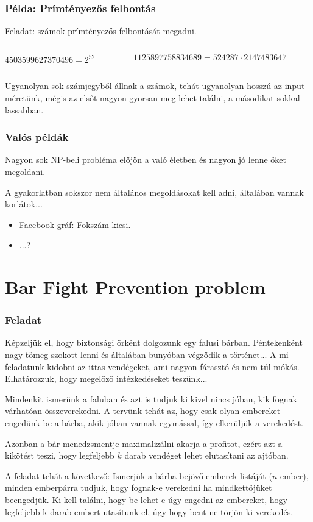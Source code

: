 \documentclass[aspectratio=169]{beamer}
\newcommand{\mkspace}{\vspace{19pt}}
\begin{document}
\begin{frame}[t]
\frametitle{Példa: Prímtényezős felbontás}

Feladat: számok prímtényezős felbontását megadni.

\mkspace
\begin{columns}
\begin{column}{0.487\textwidth}
$4503599627370496 = 2^{52}$
\end{column}
\begin{column}{0.487\textwidth}
$1125897758834689 = 524287 \cdot 2147483647$
\end{column}
\end{columns}
\mkspace

Ugyanolyan sok számjegyből állnak a számok, tehát ugyanolyan hosszú az input méretünk, mégis az elsőt
nagyon gyorsan meg lehet találni, a másodikat sokkal lassabban.

\end{frame}

\begin{frame}
\frametitle{Valós példák}
Nagyon sok NP-beli probléma előjön a való életben és nagyon jó lenne őket megoldani.

A gyakorlatban sokszor nem általános megoldásokat kell adni, általában vannak korlátok...

\begin{itemize}
\item Facebook gráf: Fokszám kicsi.
\item ...?
\end{itemize}

\end{frame}

\section{Bar Fight Prevention problem}

\begin{frame}
\frametitle{Feladat}
Képzeljük el, hogy biztonsági őrként dolgozunk egy falusi bárban. Péntekenként nagy tömeg szokott lenni és
általában bunyóban végződik a történet... A mi feladatunk kidobni az ittas vendégeket, ami nagyon fárasztó
és nem túl mókás. Elhatározzuk, hogy megelőző intézkedéseket teszünk...

Mindenkit ismerünk a faluban és azt is tudjuk ki kivel nincs jóban, kik fognak várhatóan összeverekedni.
A tervünk tehát az, hogy csak olyan embereket engedünk be a bárba, akik jóban vannak egymással, így
elkerüljük a verekedést.

Azonban a bár menedzsmentje maximalizálni akarja a profitot, ezért azt a kikötést teszi, hogy legfeljebb
$k$ darab vendéget lehet elutasítani az ajtóban.

A feladat tehát a következő: Ismerjük a bárba bejövő emberek listáját ($n$ ember), minden emberpárra
tudjuk, hogy fognak-e verekedni ha mindkettőjüket beengedjük. Ki kell találni, hogy be lehet-e úgy
engedni az embereket, hogy legfeljebb k darab embert utasítunk el, úgy hogy bent ne törjön ki verekedés.
\end{frame}
\end{document}
